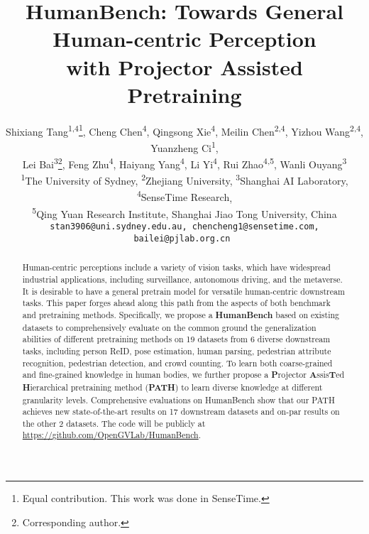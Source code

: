 \documentclass[10pt,twocolumn,letterpaper]{article}
\begin{document}
\title{HumanBench: Towards General Human-centric Perception \\ with Projector Assisted Pretraining}

\author{Shixiang Tang\textsuperscript{1,4}\thanks{Equal contribution. This work was done in SenseTime.}, Cheng Chen\textsuperscript{4}\footnotemark[\value{footnote}], Qingsong Xie\textsuperscript{4}, Meilin Chen\textsuperscript{2,4}, Yizhou Wang\textsuperscript{2,4}, Yuanzheng Ci\textsuperscript{1},\\
Lei Bai\textsuperscript{3}\thanks{Corresponding author.},
Feng Zhu\textsuperscript{4}, Haiyang Yang\textsuperscript{4}, Li Yi\textsuperscript{4}, Rui Zhao\textsuperscript{4,5}, Wanli Ouyang\textsuperscript{3} \\
{\textsuperscript{1}The University of Sydney, \textsuperscript{2}Zhejiang University, \textsuperscript{3}Shanghai AI Laboratory, \textsuperscript{4}SenseTime Research},\\ {\textsuperscript{5}Qing Yuan Research Institute, Shanghai Jiao Tong University, China} \\
\tt\small stan3906@uni.sydney.edu.au, chencheng1@sensetime.com, bailei@pjlab.org.cn
}

\maketitle

\begin{abstract}
Human-centric perceptions include a variety of vision tasks, which have widespread industrial applications, including surveillance, autonomous driving, and the metaverse.  It is desirable to have a general pretrain model for versatile human-centric downstream tasks. This paper  forges ahead along this path from the aspects of both benchmark and pretraining methods. Specifically, we propose a \textbf{HumanBench} based on existing datasets to comprehensively evaluate on the common ground the generalization abilities of different pretraining methods on 19 datasets from 6 diverse downstream tasks, including person ReID, pose estimation, human parsing, pedestrian attribute recognition, pedestrian detection, and crowd counting. To learn both coarse-grained and fine-grained knowledge in human bodies, we further propose a \textbf{P}rojector \textbf{A}ssis\textbf{T}ed \textbf{H}ierarchical pretraining method (\textbf{PATH}) to learn diverse knowledge at different granularity levels. Comprehensive evaluations on HumanBench show that our PATH achieves new state-of-the-art results on 17 downstream datasets and on-par results on the other 2 datasets. The code will be publicly at \href{https://github.com/OpenGVLab/HumanBench}{https://github.com/OpenGVLab/HumanBench}.
\end{abstract}
\end{document}
